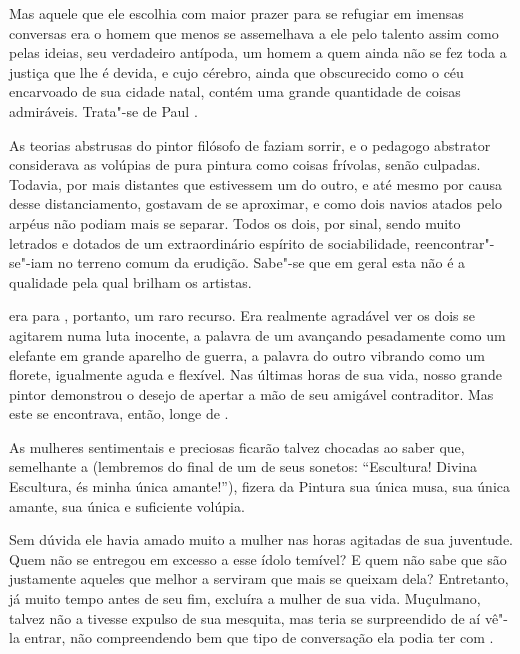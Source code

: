 Mas aquele que ele escolhia com maior prazer para se refugiar em imensas
conversas era o homem que menos se assemelhava a ele pelo talento assim
como pelas ideias, seu verdadeiro antípoda, um homem a quem ainda não
se fez toda a justiça que lhe é devida, e cujo cérebro, ainda que
obscurecido como o céu encarvoado de sua cidade natal, contém uma
grande quantidade de coisas admiráveis. Trata"-se de Paul .

As teorias abstrusas do pintor filósofo de  faziam  sorrir,
e o pedagogo abstrator considerava as volúpias de pura pintura como
coisas frívolas, senão culpadas. Todavia, por mais distantes que
estivessem um do outro, e até mesmo por causa desse distanciamento,
gostavam de se aproximar, e como dois navios atados pelo arpéus não
podiam mais se separar. Todos os dois, por sinal, sendo muito letrados
e dotados de um extraordinário espírito de sociabilidade,
reencontrar"-se"-iam no terreno comum da erudição. Sabe"-se que em geral
esta não é a qualidade pela qual brilham os artistas.

 era para , portanto, um raro recurso. Era realmente
agradável ver os dois se agitarem numa luta inocente, a palavra de um
avançando pesadamente como um elefante em grande aparelho de guerra, a
palavra do outro vibrando como um florete, igualmente aguda e flexível.
Nas últimas horas de sua vida, nosso grande pintor demonstrou o desejo
de apertar a mão de seu amigável contraditor. Mas este se encontrava,
então, longe de .

\sectionitem

As mulheres sentimentais e preciosas ficarão talvez chocadas ao saber
que, semelhante a  (lembremos do final de um de seus
sonetos: ``Escultura! Divina Escultura, és
minha única amante!''),  fizera da Pintura sua
única musa, sua única amante, sua única e suficiente volúpia.

Sem dúvida ele havia amado muito a mulher nas horas agitadas de sua
juventude. Quem não se entregou em excesso a esse ídolo temível? E quem
não sabe que são justamente aqueles que melhor a serviram que mais se
queixam dela? Entretanto, já muito tempo antes de seu fim, excluíra a
mulher de sua vida. Muçulmano, talvez não a tivesse expulso de sua
mesquita, mas teria se surpreendido de aí vê"-la entrar, não
compreendendo bem que tipo de conversação ela podia ter com .

